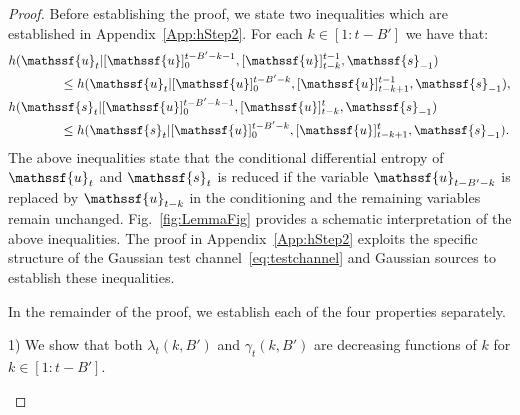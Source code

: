 \documentclass[journal, twocolumn, 10pt]{IEEEtran}
\newcommand{\rvs}{{\mathssf{s}}}    %
\newcommand{\rvu}{{\mathssf{u}}}    %
\begin{document}
\begin{proof} 
Before establishing the proof, we state two inequalities which are established in Appendix~\ref{App:hStep2}. 
For each $k \in [1:t-B']$ we have that:
\begin{align}
&h( \rvu_{t} | [\rvu]_{0}^{t-B'-k-1}, [\rvu]_{t-k}^{t-1}, \rvs_{-1})\notag\\
&\qquad \qquad \le h( \rvu_{t} | [\rvu]_{0}^{t-B'-k}, [\rvu]_{t-k+1}^{t-1}, \rvs_{-1})\label{eq:hStep2}, \\
&h( \rvs_{t} | [\rvu]_{0}^{t-B'-k-1}, [\rvu]_{t-k}^{t}, \rvs_{-1})\notag\\
&\qquad \qquad \le h( \rvs_{t} | [\rvu]_{0}^{t-B'-k}, [\rvu]_{t-k+1}^{t}, \rvs_{-1})\label{eq:hStep2D}.
\end{align}
The above inequalities state that the conditional differential entropy of $\rvu_{t}$ and $\rvs_{t}$ is reduced if the variable $\rvu_{t-B'-k}$ is replaced by $\rvu_{t-k}$ in the conditioning and the remaining variables remain unchanged.
 Fig.~\ref{fig:LemmaFig} provides a schematic interpretation of the above inequalities. The proof in Appendix~\ref{App:hStep2} exploits the specific structure of the Gaussian test channel~\eqref{eq:testchannel} and Gaussian sources to establish these inequalities.
 

In the remainder of the proof, we establish each of the four properties separately.

1) We show that both $\lambda_t(k,B')$ and $\gamma_t(k,B')$ are decreasing functions of $k$ for $k \in [1:t-B']$. 

\begin{figure}
\begin{center}
\vspace{1em}
\end{center}
\end{figure}
\end{proof}
\end{document}
